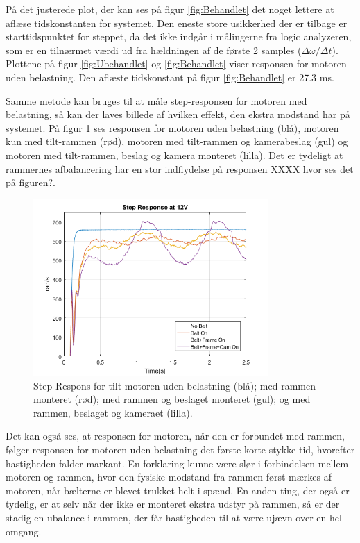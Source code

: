 På det justerede plot, der kan ses på figur \ref{fig:Behandlet} det noget lettere at aflæse tidskonstanten for systemet. Den eneste store usikkerhed der er tilbage er starttidspunktet for steppet, da det ikke indgår i målingerne fra logic analyzeren, som er en tilnærmet værdi ud fra hældningen af de første 2 samples ($\Delta\omega/\Delta t$). Plottene på figur \ref{fig:Ubehandlet} og \ref{fig:Behandlet} viser responsen for motoren uden belastning. Den aflæste tidskonstant på figur \ref{fig:Behandlet} er 27.3 ms.

Samme metode kan bruges til at måle step-responsen for motoren med belastning, så kan der laves billede af hvilken effekt, den ekstra modstand har på systemet. På figur \ref{fig:Combined} ses responsen for motoren uden belastning (blå), motoren kun med tilt-rammen (rød), motoren med tilt-rammen og kamerabeslag (gul) og motoren med tilt-rammen, beslag og kamera monteret (lilla). Det er tydeligt at rammernes afbalancering har en stor indflydelse på responsen XXXX hvor ses det på figuren?.

\begin{figure}[!ht]
	\begin{center}
		\includegraphics[width=0.8\textwidth]{Billeder/Response_Combined.png}
	\end{center}
	\caption{Step Respons for tilt-motoren uden belastning (blå); med rammen monteret (rød); med rammen og beslaget monteret (gul); og med rammen, beslaget og kameraet (lilla).}
	\label{fig:Combined}
\end{figure}

Det kan også ses, at responsen for motoren, når den er forbundet med rammen, følger responsen for motoren uden belastning det første korte stykke tid, hvorefter hastigheden falder markant. En forklaring kunne være slør i forbindelsen mellem motoren og rammen, hvor den fysiske modstand fra rammen først mærkes af motoren, når bælterne er blevet trukket helt i spænd. En anden ting, der også er tydelig, er at selv når der ikke er monteret ekstra udstyr på rammen, så er der stadig en ubalance i rammen, der får hastigheden til at være ujævn over en hel omgang.

